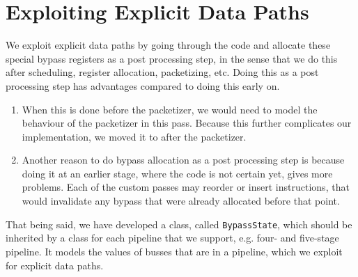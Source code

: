 



\section{Exploiting Explicit Data Paths}\label{sec:expl_bp_impl}
We exploit explicit data paths by going through the code and allocate these special bypass registers as a post processing step, in the sense that we do this after scheduling, register allocation, packetizing, etc. 
Doing this as a post processing step has advantages compared to doing this early on. 
\begin{enumerate}
\item When this is done before the packetizer, we would need to model the behaviour of the packetizer in this pass. Because this further complicates our implementation, we moved it to after the packetizer.
\item Another reason to do bypass allocation as a post processing step is because doing it at an earlier stage, where the code is not certain yet, gives more problems. Each of the custom passes may reorder or insert instructions, that would invalidate any bypass that were already allocated before that point.
\end{enumerate}

That being said, we have developed a class, called \texttt{BypassState}, which should be inherited by a class for each pipeline that we support, e.g. four- and five-stage pipeline. It models the values of busses that are in a pipeline, which we exploit for explicit data paths. %

